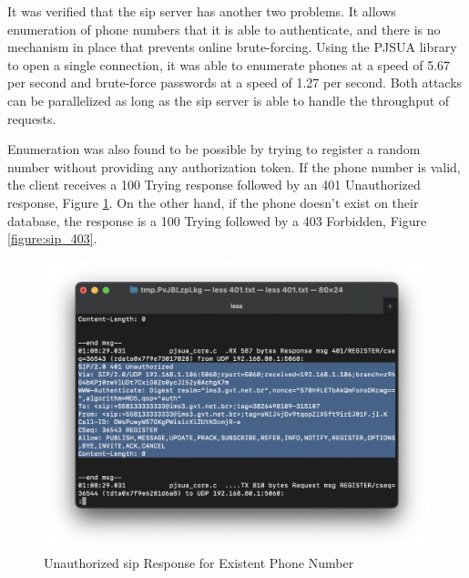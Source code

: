 It was verified that the \gls{sip} server has another two problems. It allows enumeration of phone numbers that it is able to authenticate, and there is no mechanism in place that prevents online brute-forcing. Using the PJSUA library to open a single connection, it was able to enumerate phones at a speed of 5.67 per second and brute-force passwords at a speed of 1.27 per second. Both attacks can be parallelized as long as the \gls{sip} server is able to handle the throughput of requests.

Enumeration was also found to be possible by trying to register a random number without providing any authorization token. If the phone number is valid, the client receives a 100 Trying response followed by an 401 Unauthorized response, Figure \ref{figure:sip_401}. On the other hand, if the phone doesn’t exist on their database, the response is a 100 Trying followed by a 403 Forbidden, Figure \ref{figure:sip_403}.

\begin{figure}[h]
    \centering
    \includegraphics[width=\linewidth]{contents/isp-side-services-analysis/sip/sip-401.png}
    \caption{Unauthorized \gls{sip} Response for Existent Phone Number}
    \label{figure:sip_401}
\end{figure}

